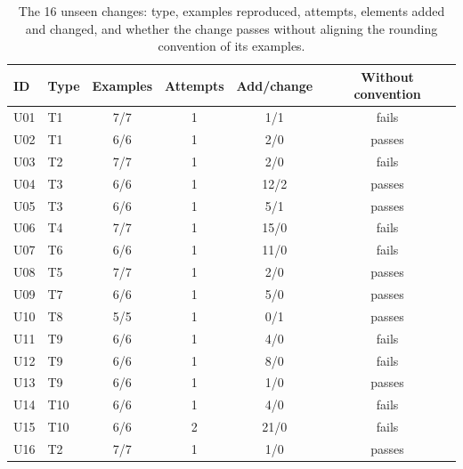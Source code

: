\begin{table}[!h]
\caption{The 16 unseen changes: type, examples reproduced, attempts, elements added and changed, and whether the change passes without aligning the rounding convention of its examples.}
\label{tab:unseen}
\centering\footnotesize
\setlength{\tabcolsep}{3pt}
\begin{tabular}{@{}llcccc@{}}
\toprule
ID & Type & Examples & Attempts & Add/change & Without convention \\
\midrule
U01 & T1 & 7/7 & 1 & 1/1 & fails \\
U02 & T1 & 6/6 & 1 & 2/0 & passes \\
U03 & T2 & 7/7 & 1 & 2/0 & fails \\
U04 & T3 & 6/6 & 1 & 12/2 & passes \\
U05 & T3 & 6/6 & 1 & 5/1 & passes \\
U06 & T4 & 7/7 & 1 & 15/0 & fails \\
U07 & T6 & 6/6 & 1 & 11/0 & fails \\
U08 & T5 & 7/7 & 1 & 2/0 & passes \\
U09 & T7 & 6/6 & 1 & 5/0 & passes \\
U10 & T8 & 5/5 & 1 & 0/1 & passes \\
U11 & T9 & 6/6 & 1 & 4/0 & fails \\
U12 & T9 & 6/6 & 1 & 8/0 & fails \\
U13 & T9 & 6/6 & 1 & 1/0 & passes \\
U14 & T10 & 6/6 & 1 & 4/0 & fails \\
U15 & T10 & 6/6 & 2 & 21/0 & fails \\
U16 & T2 & 7/7 & 1 & 1/0 & passes \\
\bottomrule
\end{tabular}
\end{table}
